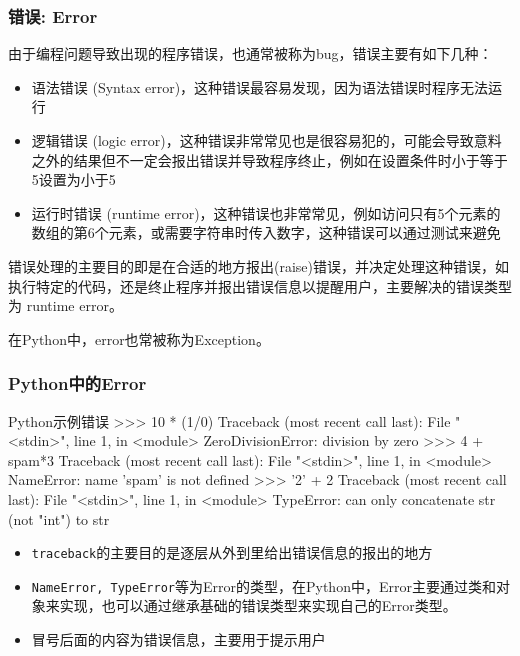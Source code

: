 \documentclass[9pt]{beamer}
\begin{document}
\begin{frame}
    \frametitle{错误: Error}

    由于编程问题导致出现的程序错误，也通常被称为bug，错误主要有如下几种：

    \begin{itemize}
        \item 语法错误 (Syntax error)，这种错误最容易发现，因为语法错误时程序无法运行
        \item 逻辑错误 (logic error)，这种错误非常常见也是很容易犯的，可能会导致意料之外的结果但不一定会报出错误并导致程序终止，例如在设置条件时小于等于5设置为小于5
        \item 运行时错误 (runtime error)，这种错误也非常常见，例如访问只有5个元素的数组的第6个元素，或需要字符串时传入数字，这种错误可以通过测试来避免
    \end{itemize}

    错误处理的主要目的即是在合适的地方报出(raise)错误，并决定处理这种错误，如执行特定的代码，还是终止程序并报出错误信息以提醒用户，主要解决的错误类型为 runtime error。
   
    在Python中，error也常被称为Exception。

\end{frame}

\begin{frame}[fragile]
    \frametitle{Python中的Error}

\begin{codebox}{Python}{示例错误}
>>> 10 * (1/0)
Traceback (most recent call last):
    File "<stdin>", line 1, in <module>
ZeroDivisionError: division by zero
>>> 4 + spam*3
Traceback (most recent call last):
    File "<stdin>", line 1, in <module>
NameError: name 'spam' is not defined
>>> '2' + 2
Traceback (most recent call last):
    File "<stdin>", line 1, in <module>
TypeError: can only concatenate str (not "int") to str
\end{codebox}

\begin{itemize}
    \item \texttt{traceback}的主要目的是逐层从外到里给出错误信息的报出的地方
    \item \texttt{NameError, TypeError}等为Error的类型，在Python中，Error主要通过类和对象来实现，也可以通过继承基础的错误类型来实现自己的Error类型。
    \item 冒号后面的内容为错误信息，主要用于提示用户
\end{itemize}

\end{frame}
\end{document}
